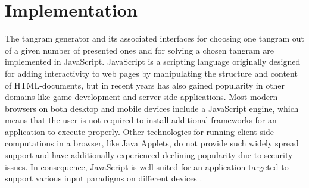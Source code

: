 \chapter{Implementation} \label{chapter:implementation}

The tangram generator and its associated interfaces for choosing one tangram out of a given number of presented ones and for solving a chosen tangram are implemented in JavaScript. JavaScript is a scripting language originally designed for adding interactivity to web pages by manipulating the structure and content of HTML-documents, but in recent years has also gained popularity in other domains like game development and server-side applications. Most modern browsers on both desktop and mobile devices include a JavaScript engine, which means that the user is not required to install additional frameworks for an application to execute properly. Other technologies for running client-side computations in a browser, like Java Applets, do not provide such widely spread support and have additionally experienced declining popularity due to security issues. In consequence, JavaScript is well suited for an application targeted to support various input paradigms on different devices \cite{mdn15}.

